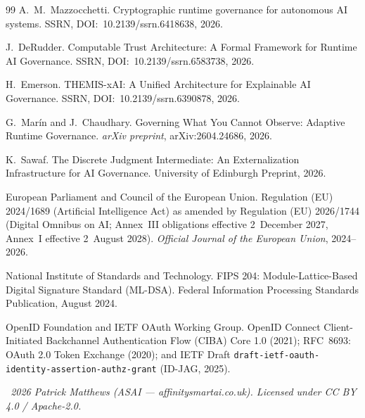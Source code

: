 \documentclass[11pt, a4paper]{article}
\begin{document}
\begin{thebibliography}{99}
A.~M.~Mazzocchetti.
\newblock Cryptographic runtime governance for autonomous AI systems.
\newblock SSRN, DOI:~10.2139/ssrn.6418638, 2026.

J.~DeRudder.
\newblock Computable Trust Architecture: A Formal Framework for Runtime AI Governance.
\newblock SSRN, DOI:~10.2139/ssrn.6583738, 2026.

H.~Emerson.
\newblock THEMIS-xAI: A Unified Architecture for Explainable AI Governance.
\newblock SSRN, DOI:~10.2139/ssrn.6390878, 2026.

G.~Mar\'{i}n and J.~Chaudhary.
\newblock Governing What You Cannot Observe: Adaptive Runtime Governance.
\newblock \textit{arXiv preprint}, arXiv:2604.24686, 2026.

K.~Sawaf.
\newblock The Discrete Judgment Intermediate: An Externalization Infrastructure for AI Governance.
\newblock University of Edinburgh Preprint, 2026.

European Parliament and Council of the European Union.
\newblock Regulation (EU) 2024/1689 (Artificial Intelligence Act) as amended by Regulation (EU) 2026/1744 (Digital Omnibus on AI; Annex~III obligations effective 2~December 2027, Annex~I effective 2~August 2028).
\newblock \textit{Official Journal of the European Union}, 2024--2026.

National Institute of Standards and Technology.
\newblock FIPS 204: Module-Lattice-Based Digital Signature Standard (ML-DSA).
\newblock Federal Information Processing Standards Publication, August 2024.

OpenID Foundation and IETF OAuth Working Group.
\newblock OpenID Connect Client-Initiated Backchannel Authentication Flow (CIBA) Core 1.0 (2021); RFC~8693: OAuth 2.0 Token Exchange (2020); and IETF Draft \texttt{draft-ietf-oauth-identity-assertion-authz-grant} (ID-JAG, 2025).

\end{thebibliography}

\vfill
\begin{center}
\small\textit{\textcopyright\ 2026 Patrick Matthews (ASAI --- affinitysmartai.co.uk). Licensed under CC BY 4.0 / Apache-2.0.}
\end{center}
\end{document}
